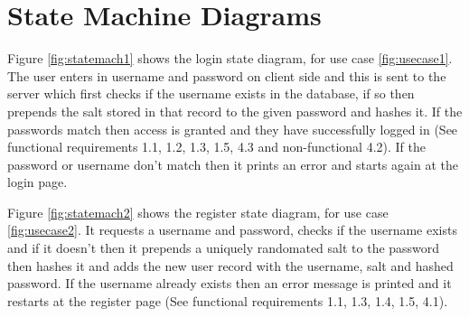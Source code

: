 \documentclass[10pt]{report}
\begin{document}
\section{State Machine Diagrams}

Figure \ref{fig:statemach1} shows the login state diagram, for use case \ref{fig:usecase1}. The  user enters in username and password on client side and this is sent to the server which first checks if the username exists in the database, if so then prepends the salt stored in that record to the given password and hashes it. If the passwords match then access is granted and they have successfully logged in (See functional requirements 1.1, 1.2, 1.3, 1.5, 4.3 and non-functional 4.2). If the password or username don’t match then it prints an error and starts again at the login page.

Figure \ref{fig:statemach2} shows the register state diagram, for use case \ref{fig:usecase2}. It requests a username and password, checks if the username exists and if it doesn’t then it prepends a uniquely randomated salt to the password then hashes it and adds the new user record with the username, salt and hashed password. If the username already exists then an error message is printed and it restarts at the register page (See functional requirements 1.1, 1.3, 1.4, 1.5, 4.1).
\end{document}
